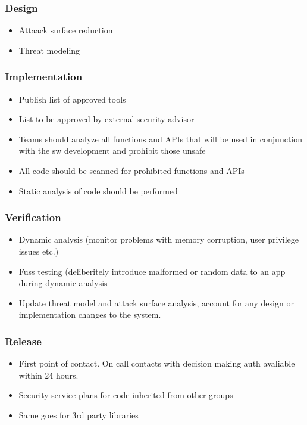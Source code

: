 \documentclass[course, english]{Notes}
\begin{document}
\subsubsection{Design}
\begin{itemize}
	\item Attaack surface reduction
	\item Threat modeling
\end{itemize}

\subsubsection{Implementation}
\begin{itemize}
	\item Publish list of approved tools
	\item List to be approved by external security advisor
	\item Teams should analyze all functions and APIs that will be used in
		conjunction with the sw development and prohibit those unsafe
	\item All code should be scanned for prohibited functions and APIs
	\item Static analysis of code should be performed
\end{itemize}

\subsubsection{Verification}
\begin{itemize}
	\item Dynamic analysis (monitor problems with memory corruption, user
		privilege issues etc.)
	\item Fuss testing (deliberitely introduce malformed or random data to
		an app during dynamic analysis
	\item Update threat model and attack surface analysis, account for any
		design or implementation changes to the system.
\end{itemize}

\subsubsection{Release}
\begin{itemize}
	\item First point of contact. On call contacts with decision making auth
		avaliable within 24 hours.
	\item Security service plans for code inherited from other groups
	\item Same goes for 3rd party libraries
\end{itemize}
\end{document}
